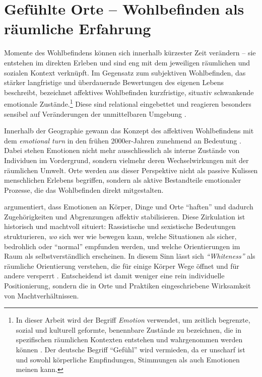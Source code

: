 \section{Gefühlte Orte -- Wohlbefinden als räumliche Erfahrung} %

Momente des Wohlbefindens können sich innerhalb kürzester Zeit verändern -- sie entstehen im direkten Erleben und sind eng mit dem jeweiligen räumlichen und sozialen Kontext verknüpft. Im Gegensatz zum subjektiven Wohlbefinden, das stärker langfristige und überdauernde Bewertungen des eigenen Lebens beschreibt, bezeichnet affektives Wohlbefinden kurzfristige, situativ schwankende emotionale Zustände.\footnote{In dieser Arbeit wird der Begriff \emph{Emotion} verwendet, um zeitlich begrenzte, sozial und kulturell geformte, benennbare Zustände zu bezeichnen, die in spezifischen räumlichen Kontexten entstehen und wahrgenommen werden können \parencite{bondiIntroductionGeographysEmotional2006}. Der deutsche Begriff \enquote{Gefühl} wird vermieden, da er unscharf ist und sowohl körperliche Empfindungen, Stimmungen als auch Emotionen meinen kann.} Diese sind relational eingebettet und reagieren besonders sensibel auf Veränderungen der unmittelbaren Umgebung \parencite{dodgeChallengeDefiningWellbeing2012}.

Innerhalb der Geographie gewann das Konzept des affektiven Wohlbefindens mit dem \emph{emotional turn} in den frühen 2000er-Jahren zunehmend an Bedeutung \parencite{hoSocialGeographyIII2024}. Dabei stehen Emotionen nicht mehr ausschliesslich als interne Zustände von Individuen im Vordergrund, sondern vielmehr deren Wechselwirkungen mit der räumlichen Umwelt. Orte werden aus dieser Perspektive nicht als passive Kulissen menschlichen Erlebens begriffen, sondern als aktive Bestandteile emotionaler Prozesse, die das Wohlbefinden direkt mitgestalten.

\textcite{ahmedAffectiveEconomies2004} argumentiert, dass Emotionen an Körper, Dinge und Orte \enquote{haften} und dadurch Zugehörigkeiten und Abgrenzungen affektiv stabilisieren. Diese Zirkulation ist historisch und machtvoll situiert: Rassistische und sexistische Bedeutungen strukturieren, \emph{wo} sich wer wie bewegen kann, welche Situationen als sicher, bedrohlich oder \enquote{normal} empfunden werden, und welche Orientierungen im Raum als selbstverständlich erscheinen. In diesem Sinn lässt sich \textit{\enquote{Whiteness}} als räumliche Orientierung verstehen, die für einige Körper Wege öffnet und für andere versperrt \parencite{ahmedPhenomenologyWhiteness2007}. Entscheidend ist damit weniger eine rein individuelle Positionierung, sondern die in Orte und Praktiken eingeschriebene Wirksamkeit von Machtverhältnissen.

